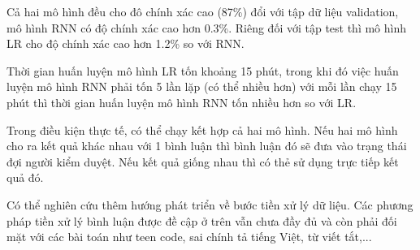 \documentclass[runningheads]{llncs}
\begin{document}
Cả hai mô hình đều cho đô chính xác cao (87\%) đổi với tập dữ liệu validation, mô hình RNN có độ chính xác cao hơn 0.3\%. Riêng đối với tập test thì mô hình LR cho độ chính xác cao hơn 1.2\% so với RNN.

Thời gian huấn luyện mô hình LR tốn khoảng 15 phút, trong khi đó việc huấn luyện mô hình RNN phải tốn 5 lần lặp (có thể nhiều hơn) với mỗi lần chạy 15 phút thì thời gian huấn luyện mô hình RNN tốn nhiều hơn so với LR.

Trong điều kiện thực tế, có thể chạy kết hợp cả hai mô hình. Nếu hai mô hình cho ra kết quả khác nhau với 1 bình luận thì bình luận đó sẽ đưa vào trạng thái đợi người kiểm duyệt. Nếu kết quả giống nhau thì có thẻ sử dụng trực tiếp kết quả đó.

Có thể nghiên cứu thêm hướng phát triển về bước tiền xử lý dữ liệu. Các phương pháp tiền xử lý bình luận được đề cập ở trên vẫn chưa đầy đủ và còn phải đối mặt với các bài toán như teen code, sai chính tả tiếng Việt, từ viết tắt,...
\end{document}
